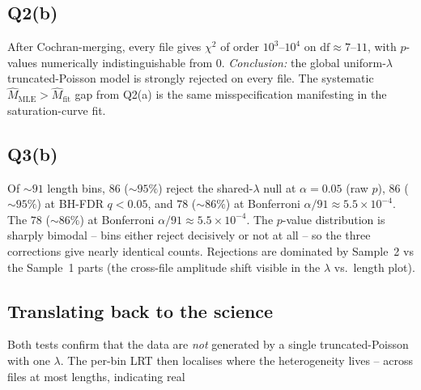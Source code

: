 \documentclass[11pt]{article}
\newcommand{\hM}{\hat{M}}
\begin{document}
\subsection{Q2(b)}
After Cochran-merging, every file gives $\chi^{2}$ of order $10^{3}$--$10^{4}$
on $\mathrm{df} \approx 7$--$11$, with $p$-values numerically
indistinguishable from $0$. \emph{Conclusion:} the global uniform-$\lambda$
truncated-Poisson model is strongly rejected on every file. The systematic
$\hM_{\text{MLE}} > \hM_{\text{fit}}$ gap from Q2(a) is the same
misspecification manifesting in the saturation-curve fit.

\subsection{Q3(b)}
Of $\sim 91$ length bins, $86$ ($\sim 95\%$) reject the shared-$\lambda$ null
at $\alpha = 0.05$ (raw $p$), $86$ ($\sim 95\%$) at BH-FDR $q < 0.05$, and
$78$ ($\sim 86\%$) at Bonferroni $\alpha/91 \approx 5.5 \times 10^{-4}$. The
$78$ ($\sim 86\%$) at Bonferroni $\alpha/91 \approx 5.5 \times 10^{-4}$. The
$p$-value distribution is sharply bimodal -- bins either reject decisively
or not at all -- so the three corrections give nearly identical counts.
Rejections are dominated by Sample~2 vs the Sample~1 parts (the cross-file
amplitude shift visible in the $\lambda$ vs.\ length plot).

\subsection{Translating back to the science}
Both tests confirm that the data are \emph{not} generated by a single
truncated-Poisson with one $\lambda$. The per-bin LRT then localises where
the heterogeneity lives -- across files at most lengths, indicating real
\end{document}
